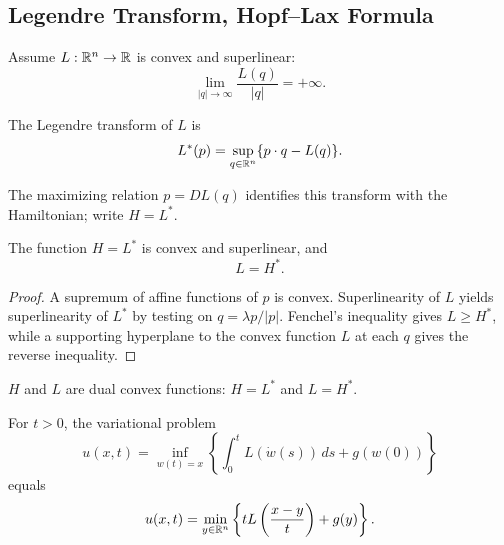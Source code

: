 \subsection{Legendre Transform, Hopf--Lax Formula}
\label{sec:legendre-transform-hopf-lax}

Assume $L:\mathbb{R}^n\to\mathbb{R}$ is convex and superlinear:
\[
\lim_{|q|\to\infty}\frac{L(q)}{|q|}=+\infty.
\]

\begin{definition}
\label{def:legendre-transform}
The Legendre transform of $L$ is
\[
L^*(p)=\sup_{q\in\mathbb{R}^n}\{p\cdot q-L(q)\}.
\]
\end{definition}

The maximizing relation $p=DL(q)$ identifies this transform with the
Hamiltonian; write $H=L^*$.

\begin{theorem}
\label{thm:convex-duality-hamiltonian-lagrangian}

The function $H=L^*$ is convex and superlinear, and
\[
L=H^*.
\]
\end{theorem}

\begin{proof}
\sketch A supremum of affine functions of $p$ is convex. Superlinearity of
$L$ yields superlinearity of $L^*$ by testing on $q=\lambda p/|p|$.
Fenchel's inequality gives $L\ge H^*$, while a supporting hyperplane to the
convex function $L$ at each $q$ gives the reverse inequality.
\end{proof}

\begin{remark}
\label{rem:dual-convex-functions}

$H$ and $L$ are dual convex functions: $H=L^*$ and $L=H^*$.
\end{remark}

\begin{theorem}
\label{thm:hopf-lax-formula-derivation}

For $t>0$, the variational problem
\[
u(x,t)=\inf_{w(t)=x}\left\{\int_0^tL(\dot w(s))\,ds+g(w(0))\right\}
\]
equals
\[
u(x,t)=\min_{y\in\mathbb{R}^n}\left\{tL\left(\frac{x-y}{t}\right)+g(y)\right\}.
\]
\end{theorem}

